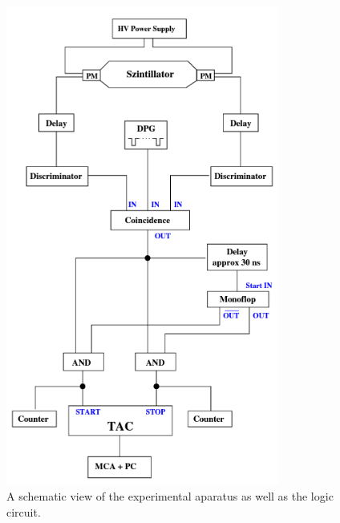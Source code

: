 \begin{figure}
    \centering
    \includegraphics[width = 0.8\textwidth]{pics/Aufbau.png}
    \caption{A schematic view of the experimental aparatus as well as the logic circuit. \cite{v01}}
    \label{fig:Aufbau}
\end{figure}